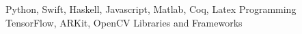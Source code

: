 \begin{cventries}
  \cvsmallentry
    {Python, Swift, Haskell, Javascript, Matlab, Coq, Latex}
    {Programming}
    {}
    {}
    {}
  \cvsmallentry
    {TensorFlow, ARKit, OpenCV}
    {Libraries and Frameworks}
    {}
    {}
    {}
\end{cventries}





